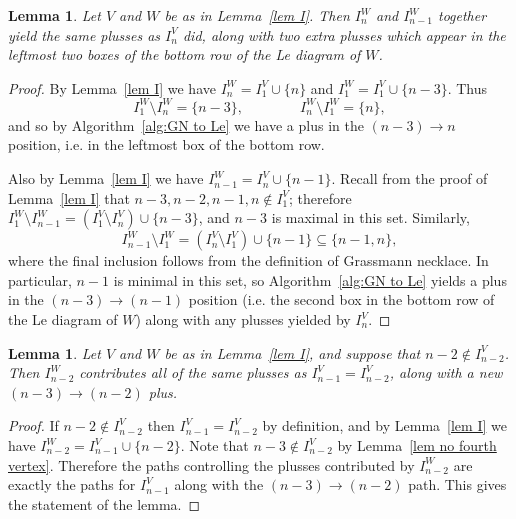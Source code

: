\documentclass[11pt]{article}
\newtheorem{lem}[thm]{Lemma}
\theoremstyle{remark}
\theoremstyle{definition}
\begin{document}
\begin{lem}\label{lem n and n-1}
Let $V$ and $W$ be as in Lemma~\ref{lem I}.
Then $I_n^{W}$ and $I_{n-1}^{W}$ together yield the same plusses as $I_n^{V}$ did, along with two extra plusses which appear in the leftmost two boxes of the bottom row of the Le diagram of $W$.
\end{lem}

\begin{proof}
By Lemma~\ref{lem I} we have $I_n^{W}= I_1^{V} \cup \{n\}$ and $I_1^{W} = I_1^{V} \cup \{n-3\}$. Thus 
\[I_1^{W} \setminus I_n^{W} = \{n-3\}, \qquad \qquad I_n^{W} \setminus I_1^{W} = \{n\},\]
and so by Algorithm~\ref{alg:GN to Le} we have a plus in the $(n-3) \rightarrow n$ position, i.e. in the leftmost box of the bottom row. 

Also by Lemma~\ref{lem I} we have $I_{n-1}^{W} = I_n^{V} \cup \{n-1\}$. Recall from the proof of Lemma~\ref{lem I} that $n-3,n-2,n-1,n \not\in I_1^V$; therefore $I_1^W\setminus I_{n-1}^W = (I_1^V \setminus I_n^V) \cup\{n-3\}$, and $n-3$ is maximal in this set. Similarly, 
\[I_{n-1}^W \setminus I_1^W = (I_n^V \setminus I_1^V) \cup \{n-1\} \subseteq \{n-1,n\},\]
where the final inclusion follows from the definition of Grassmann necklace. In particular, $n-1$ is minimal in this set, so Algorithm~\ref{alg:GN to Le} yields a plus in the $(n-3) \rightarrow (n-1)$ position (i.e. the second box in the bottom row of the Le diagram of $W$) along with any plusses yielded by $I_n^V$.
\end{proof} 



\begin{lem}\label{lem n-2 good}
  Let $V$ and $W$ be as in Lemma~\ref{lem I}, and suppose that $n-2 \not\in I_{n-2}^{V}$. Then $I_{n-2}^{W}$ contributes all of the same plusses as $I_{n-1}^{V}=I_{n-2}^{V}$, along with a new $(n-3)\rightarrow (n-2)$ plus.
\end{lem}

\begin{proof}
If $n-2\not\in I_{n-2}^{V}$ then $I_{n-1}^{V}=I_{n-2}^{V}$ by definition, and by Lemma~\ref{lem I} we have $I_{n-2}^{W} = I_{n-1}^{V} \cup \{n-2\}$.  Note that $n-3\not\in I_{n-2}^{V}$ by Lemma~\ref{lem no fourth vertex}.  Therefore the paths controlling the plusses contributed by $I_{n-2}^{W}$ are exactly the paths for $I_{n-1}^{V}$ along with the $(n-3)\rightarrow (n-2)$ path.  This gives the statement of the lemma.
\end{proof}
\end{document}
